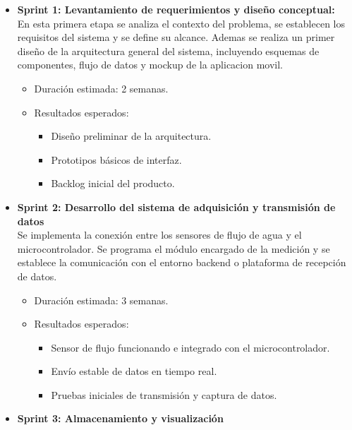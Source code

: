 \documentclass[conference]{IEEEtran}
\begin{document}
\begin{itemize}
    \item \textbf{Sprint 1: Levantamiento de requerimientos y diseño conceptual:} \\
          En esta primera etapa se analiza el contexto del problema, se establecen los requisitos del sistema y se define su alcance. Ademas se realiza un primer diseño de la arquitectura general del sistema, incluyendo esquemas de componentes, flujo de datos y mockup de la aplicacion movil.
          \begin{itemize}
              \item Duración estimada: 2 semanas.
              \item Resultados esperados:
                    \begin{itemize}
                        \item Diseño preliminar de la arquitectura.
                        \item Prototipos básicos de interfaz.
                        \item Backlog inicial del producto.
                    \end{itemize}
          \end{itemize}
    \item \textbf{Sprint 2: Desarrollo del sistema de adquisición y transmisión de datos}\\
          Se implementa la conexión entre los sensores de flujo de agua y el microcontrolador. Se programa el módulo encargado de la medición y se establece la comunicación con el entorno backend o plataforma de recepción de datos.
          \begin{itemize}
              \item Duración estimada: 3 semanas.
              \item Resultados esperados:
                    \begin{itemize}
                        \item Sensor de flujo funcionando e integrado con el microcontrolador.
                        \item Envío estable de datos en tiempo real.
                        \item Pruebas iniciales de transmisión y captura de datos.
                    \end{itemize}
          \end{itemize}
    \item \textbf{Sprint 3: Almacenamiento y visualización}\\

\end{itemize}
\end{document}
